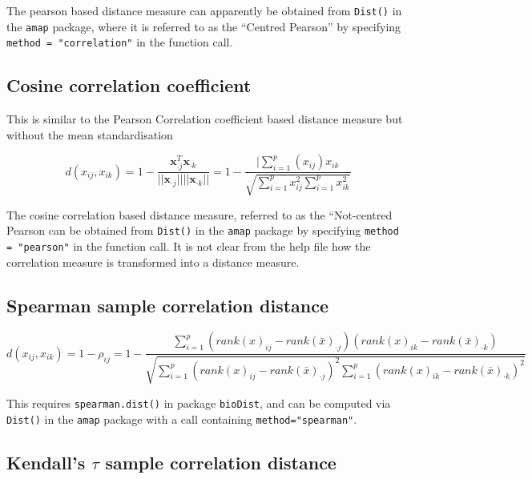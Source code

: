 The pearson based distance measure can apparently be obtained from \verb+Dist()+ in the \verb+amap+ package, where it is referred to as the ``Centred Pearson'' by specifying \verb+method = "correlation"+ in the function call.  

\subsection{Cosine correlation coefficient}
\label{cosinedist}

This is similar to the Pearson Correlation coefficient based distance measure but without the mean standardisation

\begin{displaymath}
\label{cosinedistF}
d(x_{ij},x_{ik}) = 1 - \frac{\boldsymbol{x}_{\cdot j}^{T} \boldsymbol{x}_{\cdot k}}{||\boldsymbol{x}_{\cdot j}|| ||\boldsymbol{x}_{\cdot k}||} = 1 - \frac{|\sum_{i=1}^{p} (x_{ij}) x_{ik} }{\sqrt{\sum_{i=1}^{p} x_{ij}^{2} \sum_{i=1}^{p} x_{ik}^{2}}}
\end{displaymath}


The cosine correlation based distance measure, referred to as the ``Not-centred Pearson  can be obtained from \verb+Dist()+ in the \verb+amap+ package by specifying \verb+method = "pearson"+ in the function call.    It is not clear from the help file how the correlation measure is transformed into a distance measure.

\subsection{Spearman sample correlation distance}
\label{spearmandist}

\begin{displaymath}
\label{spearmandistF}
d(x_{ij},x_{ik}) = 1 - \rho_{ij} = 
1 - \frac{\sum_{i=1}^{p} (rank(x)_{ij} - rank(\bar{x})_{\cdot j}) (rank(x)_{ik} - rank(\bar{x})_{\cdot k})}
{\sqrt{\sum_{i=1}^{p} (rank(x)_{ij} - rank(\bar{x})_{\cdot j})^{2} \sum_{i=1}^{p} ( rank(x)_{ik} - rank(\bar{x})_{\cdot k})^{2}}}
\end{displaymath}

This requires \verb+spearman.dist()+ in package \verb+bioDist+, and can be computed via \verb+Dist()+ in the \verb+amap+ package with a call containing \verb+method="spearman"+.


\subsection{Kendall's $\tau$ sample correlation distance}
\label{kendalltaudist}

